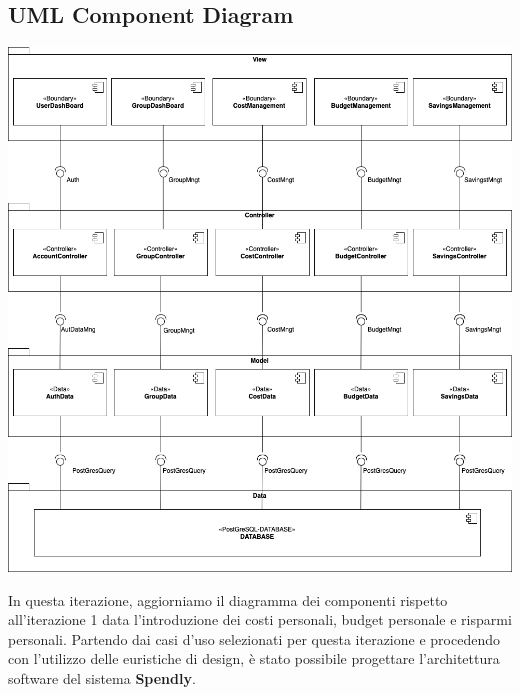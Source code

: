 \subsection{UML Component Diagram}

\begin{center}
    \includegraphics[scale=0.4]{images/ComponentDiagramV1.4.png}
\end{center}

In questa iterazione, aggiorniamo il diagramma dei componenti rispetto all'iterazione 1 data l'introduzione dei costi personali, budget personale e risparmi personali. 
Partendo dai casi d’uso selezionati per questa iterazione e procedendo con l’utilizzo delle euristiche di design, è stato possibile progettare l’architettura software del sistema \textbf{Spendly}.  

